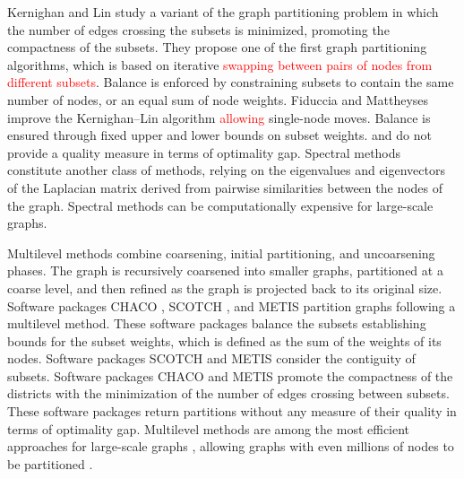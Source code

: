 \documentclass[preprint,11pt]{elsarticle}
\begin{document}
Kernighan and Lin \citep{Kernighan1970} study a variant of the graph partitioning problem in which the number of edges crossing the subsets is minimized, promoting the compactness of the subsets.
They propose one of the first graph partitioning algorithms, which is based on iterative \textcolor{red}{swapping between pairs of nodes from different subsets}. 
Balance is enforced by constraining subsets to contain the same number of nodes, or an equal sum of node weights. 
Fiduccia and Mattheyses \citep{Fiduccia1982} improve the Kernighan–Lin algorithm \textcolor{red}{allowing} single-node moves.
Balance is ensured through fixed upper and lower bounds on subset weights.
\citep{Kernighan1970} and \citep{Fiduccia1982} do not provide a quality measure in terms of optimality gap.
Spectral methods \citep{Dinardo2017, Newman2013, Pothen1990} constitute another class of methods, relying on the eigenvalues and eigenvectors of the Laplacian matrix derived from pairwise similarities between the nodes of the graph. 
Spectral methods can be computationally expensive for large-scale graphs.

Multilevel methods combine coarsening, initial partitioning, and uncoarsening phases. 
The graph is recursively coarsened into smaller graphs, partitioned at a coarse level, and then refined as the graph is projected back to its original size. 
Software packages CHACO \citep{Hendrickson1995}, SCOTCH \citep{Pellegrini1996}, and METIS \citep{Karypis1998} partition graphs following a multilevel method.
These software packages balance the subsets establishing bounds for the subset weights, which is defined as the sum of the weights of its nodes.
Software packages SCOTCH and METIS consider the contiguity of subsets.
Software packages CHACO and METIS promote the compactness of the districts with the minimization of the number of edges crossing between subsets.
These software packages return partitions without any measure of their quality in terms of optimality gap.
Multilevel methods are among the most efficient approaches for large-scale graphs \citep{Jafari2021}, allowing graphs with even millions of nodes to be partitioned \citep{Lasalle2015}.
\end{document}
